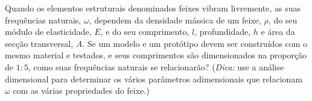 Quando os elementos estruturais denominados feixes vibram livremente, as suas frequências naturais, $\omega$, dependem da densidade mássica de um feixe, $\rho$, do seu módulo de elasticidade, $E$, e do seu comprimento, $l$, profundidade, $h$ e área da secção transversal, $A$. Se um modelo e um protótipo devem ser construídos com o mesmo material e testados, e seus comprimentos são dimensionados na proporção de $1:5$, como suas frequências naturais se relacionarão? (\textit{Dica:} use a análise dimensional para determinar os vários parâmetros adimensionais que relacionam $\omega$ com as várias propriedades do feixe.)


